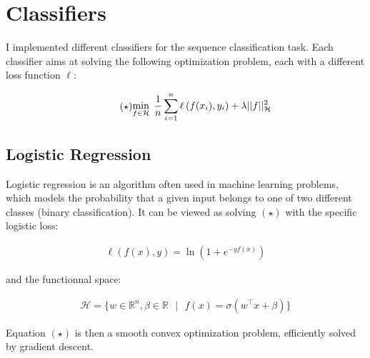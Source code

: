\documentclass[final]{cvpr}
\begin{document}
	\section{Classifiers}
	
	I implemented different classifiers for the sequence classification task. Each classifier aims at solving the following optimization problem, each with a different loss function $\ell$:

	\vspace{-1mm}
	
	\begin{equation*}\tag{$\star$}
		\begin{aligned}
			\min_{f \in \mathcal{H}}  \hspace{1mm} \dfrac{1}{n} \sum_{i=1}^{n} \ell  \left( f(x_i), y_i \right) + \lambda \vert \vert f \vert \vert_\mathcal{H}^2
		\end{aligned}
	\end{equation*}

	\subsection{Logistic Regression}
	
	Logistic regression is an algorithm often used in machine learning problems, which models the probability that a given input belongs to one of two different classes (binary classification). It can be viewed as solving $(\star)$ with the specific logistic loss:
	
	\vspace{-2mm}
	
	\begin{equation*}
		\begin{aligned}
			\ell  \left( f(x), y \right) = \ln \left(1+e^{-yf(x)} \right)
		\end{aligned}
	\end{equation*}
	
	\noindent
	and the functionnal space:
	
	\vspace{-4mm}
	
	\begin{equation*}
		\begin{aligned}
			\mathcal{H} = \{ w \in \mathbb{R}^n, \beta \in \mathbb{R}  \textit{ } \vert \textit{ } f(x) = \sigma(w^\top x + \beta) \}
		\end{aligned}
	\end{equation*}
	
	\noindent
	Equation $(\star)$ is then a smooth convex optimization problem, efficiently solved by gradient descent.
	
\end{document}

